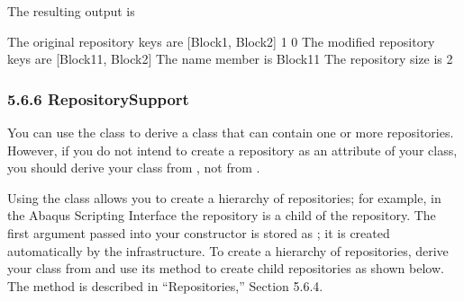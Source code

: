 \documentclass[letterpaper,10pt,english]{sphinxmanual}
\begin{document}
The resulting output is

\begin{sphinxVerbatim}[commandchars=\\\{\},numbers=left,firstnumber=1,stepnumber=1]
The original repository keys are [\PYGZsq{}Block\PYGZhy{}1\PYGZsq{}, \PYGZsq{}Block\PYGZhy{}2\PYGZsq{}]
1
0
The modified repository keys are [\PYGZsq{}Block\PYGZhy{}11\PYGZsq{}, \PYGZsq{}Block\PYGZhy{}2\PYGZsq{}]
The name member is Block\PYGZhy{}11
The repository size is 2
\end{sphinxVerbatim}


\subsubsection{5.6.6 RepositorySupport}
\label{\detokenize{abq_script_guide:repositorysupport}}
You can use the  class to derive a class that can contain one or more repositories. However, if you do not intend to create a repository as an attribute of your class, you should derive your class from , not from .

Using the  class allows you to create a hierarchy of repositories; for example, in the Abaqus Scripting Interface the  repository is a child of the  repository. The first argument passed into your constructor is stored as ; it is created automatically by the infrastructure. To create a hierarchy of repositories, derive your class from  and use its  method to create child repositories as shown below. The  method is described in “Repositories,” Section 5.6.4.
\end{document}
